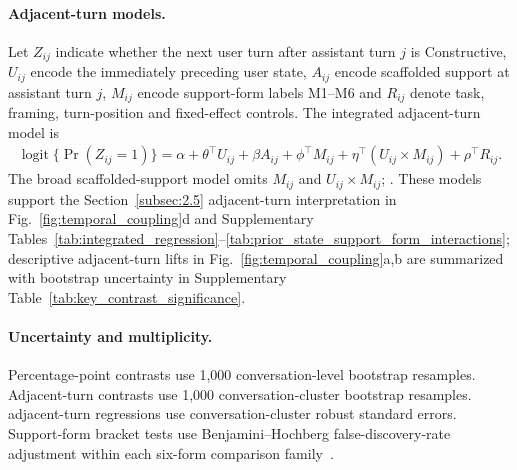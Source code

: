 \paragraph{Adjacent-turn models.}
Let $Z_{ij}$ indicate whether the next user turn after assistant turn $j$ is Constructive, $U_{ij}$ encode the immediately preceding user state, $A_{ij}$ encode scaffolded support at assistant turn $j$, $M_{ij}$ encode support-form labels M1--M6 and $R_{ij}$ denote task, framing, turn-position and fixed-effect controls. The integrated adjacent-turn model is
\begin{align*}
\operatorname{logit}\{\Pr(Z_{ij}=1)\}
  = \alpha + \theta^\top U_{ij} + \beta A_{ij}
  + \phi^\top M_{ij} + \eta^\top (U_{ij}\times M_{ij}) + \rho^\top R_{ij}.
\end{align*}
The broad scaffolded-support model omits $M_{ij}$ and $U_{ij}\times M_{ij}$; .
These models support the Section~\ref{subsec:2.5} adjacent-turn interpretation in Fig.~\ref{fig:temporal_coupling}d and Supplementary Tables~\ref{tab:integrated_regression}--\ref{tab:prior_state_support_form_interactions}; descriptive adjacent-turn lifts in Fig.~\ref{fig:temporal_coupling}a,b are summarized with bootstrap uncertainty in Supplementary Table~\ref{tab:key_contrast_significance}.

\paragraph{Uncertainty and multiplicity.}
Percentage-point contrasts use 1,000 conversation-level bootstrap resamples. Adjacent-turn contrasts use 1,000 conversation-cluster bootstrap resamples.  adjacent-turn regressions use conversation-cluster robust standard errors. Support-form bracket tests use Benjamini--Hochberg false-discovery-rate adjustment within each six-form comparison family~\cite{benjamini1995controlling}.

